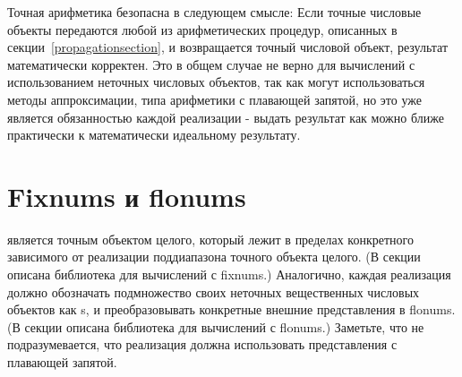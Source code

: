 Точная арифметика безопасна в следующем смысле: Если точные числовые объекты передаются любой из
арифметических процедур, описанных в секции~\ref{propagationsection}, и возвращается точный
числовой объект, результат математически корректен. Это в общем случае не верно для вычислений с
использованием неточных числовых объектов, так как могут использоваться методы аппроксимации,
типа арифметики с плавающей запятой, но это уже является обязанностью каждой реализации -
выдать результат как можно ближе практически к математически идеальному результату.

\section{Fixnums и flonums}

 является точным объектом целого, который лежит в пределах конкретного
зависимого от реализации поддиапазона точного объекта целого. (В секции
 описана библиотека для вычислений с fixnums.) Аналогично,
каждая реализация должно обозначать подмножество своих неточных вещественных числовых объектов
как s, и преобразовывать конкретные внешние представления в flonums. (В секции
 описана библиотека для вычислений с flonums.) Заметьте, что
не подразумевается, что реализация должна использовать представления с плавающей запятой.

